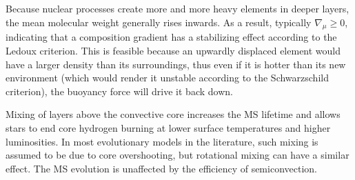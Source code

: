 \documentclass[aps,prb,twocolumn,superscriptaddress,floatfix,longbibliography]{revtex4-2}
\begin{document}
Because nuclear processes create more and more heavy elements in deeper layers, the mean molecular weight generally rises inwards. As a result, typically $\nabla_{\mu} \geq 0$, indicating that a composition gradient has a stabilizing effect according to the Ledoux criterion. This is feasible because an upwardly displaced element would have a larger density than its surroundings, thus even if it is hotter than its new environment (which would render it unstable according to the Schwarzschild criterion), the buoyancy force will drive it back down.

Mixing of layers above the convective core increases the MS lifetime and allows stars to end core hydrogen burning at lower surface temperatures and higher luminosities. In most evolutionary models in the literature, such mixing is assumed to be due to core overshooting, but rotational mixing can have a similar effect. The MS evolution is unaffected by the efficiency of semiconvection.
\section{}

%
%
\end{document}
